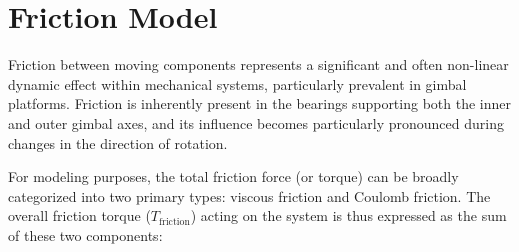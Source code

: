 








\section{Friction Model}
Friction between moving components represents a significant and often non-linear dynamic effect within mechanical systems, particularly prevalent in gimbal platforms. Friction is inherently present in the bearings supporting both the inner and outer gimbal axes, and its influence becomes particularly pronounced during changes in the direction of rotation.

For modeling purposes, the total friction force (or torque) can be broadly categorized into two primary types: viscous friction and Coulomb friction. The overall friction torque ($T_{\text{friction}}$) acting on the system is thus expressed as the sum of these two components:

